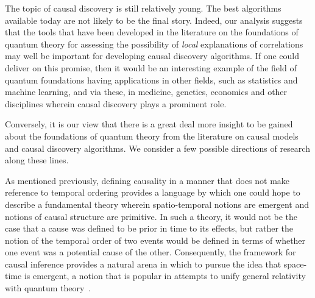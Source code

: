 \documentclass[12pt,onecolumn,nofootinbib]{revtex4-2}
\begin{document}
The topic of causal discovery is still relatively young. The best algorithms
available today are not likely to be the final story.
Indeed, our analysis suggests that the tools that have been developed in
the literature on the foundations of quantum theory for assessing the possibility of \emph{local} explanations of correlations may well be important
for developing causal discovery algorithms. If one could deliver on this
promise, then it would be an interesting example of the field of quantum
foundations having applications in other fields, such as statistics and machine learning, and via these, in medicine, genetics, economics and other disciplines wherein causal discovery plays a prominent role.

Conversely, it is our view that there is a great deal more insight to be
gained about the foundations of quantum theory from the literature on causal
models and causal discovery algorithms.
We consider a few possible directions of research along these lines.

As mentioned previously,  defining causality in a manner that does not make reference to temporal ordering provides a language by which one could hope to describe a fundamental theory wherein spatio-temporal notions are emergent and notions of causal structure are primitive. In such a theory, it would not be the case that a cause was defined to be prior in time to its effects, but rather the notion of the temporal order of two events would be defined in terms of whether one event was a potential cause of the other.  Consequently, the framework for causal inference provides a natural arena in which to pursue the idea that space-time is emergent, a notion that is popular in attempts to unify general relativity with quantum theory~\cite{markopoulou2007new,dowker2005causal}.
\end{document}
